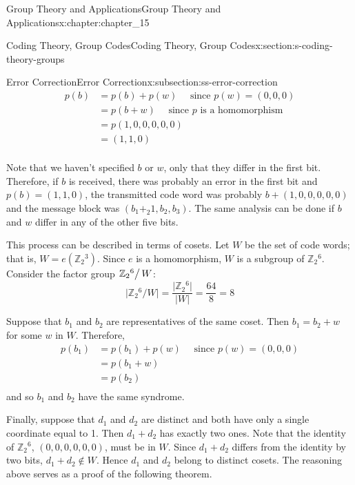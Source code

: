 \documentclass[twoside,10pt,]{book}
\numberwithin{equation}{section}
\begin{document}
\begin{chapterptx}{Group Theory and Applications}{}{Group Theory and Applications}{}{}{x:chapter:chapter_15}
\begin{sectionptx}{Coding Theory, Group Codes}{}{Coding Theory, Group Codes}{}{}{x:section:s-coding-theory-groups}
\begin{subsectionptx}{Error Correction}{}{Error Correction}{}{}{x:subsection:ss-error-correction}
\begin{equation*}
\begin{split}
p(b) & = p(b) + p(w)\quad \textrm{  since }p(w) = (0, 0, 0)\\
&=p(b+w)\quad\textrm{ since }p \textrm{ is a homomorphism}\\
& =p(1,0,0,0,0,0)\\
& =(1,1,0)\\
\end{split}
\end{equation*}
%
\par
Note that we haven't specified \(b\) or \(w\), only that they differ in the first bit. Therefore, if \(b\) is received, there was probably an error in the first bit and \(p(b)
= (1, 1, 0)\), the transmitted code word was probably \(b + (1, 0, 0, 0, 0, 0)\) and the message block was \(\left(b_1+_2 1, b_2, b_3\right)\). The same analysis can be done if \(b\) and \(w\) differ in any of the other five bits.%
\par
This process can be described in terms of cosets. Let \(W\) be the set of code words; that is, \(W = e\left(\mathbb{Z}_2{}^3 \right)\). Since \(e\) is a homomorphism, \(W\) is a subgroup of \(\mathbb{Z}_2{}^6\). Consider the factor group \(\left.\mathbb{Z}_2{}^6\right/W\):%
\begin{equation*}
\lvert \mathbb{Z}_2{}^6/W \rvert =\frac{\lvert \mathbb{Z}_2{}^6 \rvert }{\lvert W \rvert}=\frac{64}{8}=8
\end{equation*}
%
\par
Suppose that \(b_1\) and \(b_2\) are representatives of the same coset. Then \(b_1= b_2+w\) for some \(w\) in \(W\).  Therefore,%
\begin{equation*}
\begin{split}
p\left(b _1\right) &= p\left(b_1\right) + p(w)\quad \textrm{ since } p(w) = (0, 0, 0)\\
&= p\left(b_1 + w\right)\\
&= p\left(b_2 \right)\\
\end{split}
\end{equation*}
and so \(b_1\) and \(b_2\) have the same syndrome.%
\par
Finally, suppose that \(d_1\) and \(d_2\) are distinct and both have only a single coordinate equal to 1. Then \(d_1+d_2\) has exactly two ones. Note that the identity of \(\mathbb{Z}_2{}^6\),  \((0, 0, 0, 0, 0, 0)\), must be in \(W\). Since \(d_1+d_2\) differs from the identity by two bits, \(d_1+d_2 \notin  W\).   Hence \(d_1\) and \(d_2\) belong to distinct cosets. The reasoning above serves as a proof of the following theorem.%

\end{subsectionptx}
\end{sectionptx}
\end{chapterptx}
\end{document}
